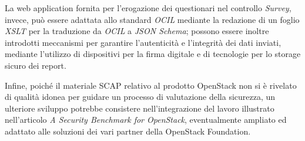 \documentclass[../main.tex]{subfiles}
\begin{document}
La web application fornita per l'erogazione dei questionari nel controllo \textit{Survey}, invece, può essere adattata allo standard \textit{OCIL} mediante la redazione di un foglio \textit{XSLT} per la traduzione da \textit{OCIL} a \textit{JSON Schema}; possono essere inoltre introdotti meccanismi per garantire l'autenticità e l'integrità dei dati inviati, mediante l'utilizzo di dispositivi per la firma digitale e di tecnologie per lo storage sicuro dei report.

Infine, poiché il materiale SCAP relativo al prodotto OpenStack non si è rivelato di qualità idonea per guidare un processo di valutazione della sicurezza, un ulteriore sviluppo potrebbe consistere nell'integrazione del lavoro illustrato nell'articolo \textit{A Security Benchmark for OpenStack}, eventualmente ampliato ed adattato alle soluzioni dei vari partner della OpenStack Foundation.
\end{document}
